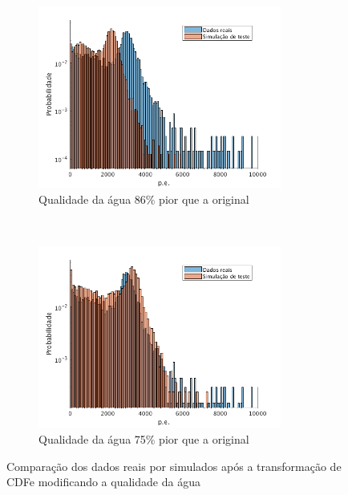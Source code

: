 \begin{figure}[ht]
	\centering
	\begin{subfigure}{0.5\textwidth}
		\centering
		\includegraphics[width=8cm]{textuais/simulacao/figuras/hist_evt3.png}
		\caption{Qualidade da água 86\% pior que a original}
		\label{fig:a3}
	\end{subfigure}%
	~ 
	\begin{subfigure}{0.5\textwidth}
		\centering		
		\includegraphics[width=8cm]{textuais/simulacao/figuras/hist_evt5.png}
		\caption{Qualidade da água 75\% pior que a original}
		\label{fig:a4}
	\end{subfigure}
	\caption{Comparação dos dados reais por simulados após a transformação de CDFe modificando a qualidade da água}
\end{figure}


